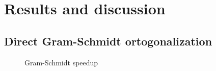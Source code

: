 \chapter{Results and discussion}

\section{Direct Gram-Schmidt ortogonalization}

\begin{figure}[ht]
  \begin{center}
  \end{center}
  \caption{Gram-Schmidt speedup}
  \label{fig:gram_speedup}
\end{figure} 



